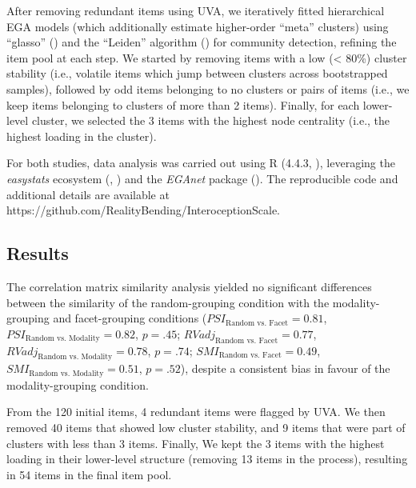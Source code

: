 \documentclass[
  jou,
  floatsintext,
  longtable,
  nolmodern,
  notxfonts,
  notimes,
  colorlinks=true,linkcolor=blue,citecolor=blue,urlcolor=blue]{apa7}
\begin{document}
After removing redundant items using UVA, we iteratively fitted
hierarchical EGA models (which additionally estimate higher-order
``meta'' clusters) using ``glasso''
() and the
``Leiden'' algorithm () for community detection, refining the item pool at each step. We
started by removing items with a low (\textless{} 80\%) cluster
stability (i.e., volatile items which jump between clusters across
bootstrapped samples), followed by odd items belonging to no clusters or
pairs of items (i.e., we keep items belonging to clusters of more than 2
items). Finally, for each lower-level cluster, we selected the 3 items
with the highest node centrality (i.e., the highest loading in the
cluster).

For both studies, data analysis was carried out using R (4.4.3,
), leveraging the
\emph{easystats} ecosystem (, ) and the
\emph{EGAnet} package
(). The reproducible code and additional details are available at
https://github.com/RealityBending/InteroceptionScale.

\subsection{Results}\label{results}

The correlation matrix similarity analysis yielded no significant
differences between the similarity of the random-grouping condition with
the modality-grouping and facet-grouping conditions
(\(PSI_{\text{Random vs. Facet}} = 0.81\),
\(PSI_{\text{Random vs. Modality}} = 0.82\), \(p = .45\);
\(RVadj_{\text{Random vs. Facet}} = 0.77\),
\(RVadj_{\text{Random vs. Modality}} = 0.78\), \(p = .74\);
\(SMI_{\text{Random vs. Facet}} = 0.49\),
\(SMI_{\text{Random vs. Modality}} = 0.51\), \(p = .52\)), despite a
consistent bias in favour of the modality-grouping condition.

From the 120 initial items, 4 redundant items were flagged by UVA. We
then removed 40 items that showed low cluster stability, and 9 items
that were part of clusters with less than 3 items. Finally, We kept the
3 items with the highest loading in their lower-level structure
(removing 13 items in the process), resulting in 54 items in the final
item pool.
\end{document}
